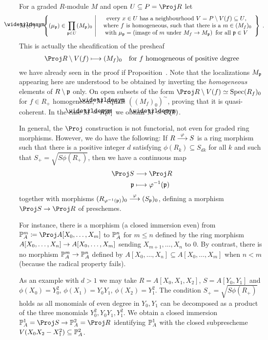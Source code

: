\documentclass[a4paper,parskip=half,numbers=enddot, DIV=12]{scrreprt}
\begin{document}
\begin{rem}
	For a graded $R$-module $M$ and open $U\subseteq P=\Proj R$ let 
	\begin{align*}
		\snake{M}(U)=\left\{(\mu_\pp)\in\prod_{\pp\in U}(M_\pp)_0\st\begin{array}{c}
		\text{every }x\in U\text{ has a neighbourhood }V=P\setminus V(f)\subseteq U\text{,}\\
		\text{ where }f\text{ is homogeneous,  such that there is a }m\in (M_f)_0\\
		\text{with }\mu_\pp=\left(\text{image of }m\text{ under }M_f\morphism M_\pp\right)\text{ for all }\pp\in V
		\end{array}\right\}\;.
	\end{align*}
	 This is actually the sheafification of the presheaf 
	 \begin{align*}
		 \Proj R\setminus V(f)\longmapsto (M_f)_0\quad\text{for }f\text{ homogeneous of positive degree}
	 \end{align*}
	 we have already seen in the proof if Proposition~. Note that the localizations $M_{\mathfrak{p}}$ appearing here are understood to be obtained by inverting the \emph{homogeneous} elements of $R\setminus \mathfrak{p}$ only. On open subsets of the form $\Proj R\setminus V(f)\simeq \Spec (R_f)_0$ for $f\in R_+$ homogeneous, $\snake{M}$ equals $((M_f)_0)^\sim$, proving that it is quasi-coherent. In the case $\snake{M}=R[k]$ we obtain $\snake{M}\simeq \Oo(k)$.
\end{rem}
\begin{rem}
	In general, the $\Proj$ construction is not functorial, not even for graded ring morphisms. However, we do have the following: If $R\morphism[\phi]S$ is a ring morphism such that there is a positive integer $d$ satisfying $\phi(R_k)\subseteq S_{dk}$ for all $k$ and such that $S_+=\sqrt{S\phi(R_+)}$, then we have a continuous map
	\begin{align*}
		\Proj S&\morphism\Proj R\\
		\pp &\longmapsto\phi^{-1}(\pp)
	\end{align*}
	together with morphisms $(R_{\phi^{-1}(\pp)})_0\morphism[\phi](S_\pp)_0$, defining a morphism $\Proj S\morphism \Proj R$ of preschemes. 
	
	For instance, there is a morphism (a closed immersion even) from $\IP_A^m\coloneqq\Proj A[X_0,\ldots,X_m]$ to $\mathbb{P}_A^n$ for $m\leq n$ defined by the ring morphism $A[X_0,\ldots,X_n]\morphism A[X_0,\ldots,X_m]$ sending $X_{m+1},\ldots,X_n$ to $0$. By contrast, there is no morphism $\IP_A^m\morphism\IP_A^n$ defined by $A[X_0,\ldots,X_n]\subseteq A[X_0,\ldots,X_m]$ when $n<m$ (because the radical property fails).
	
	As an example with $d>1$ we may take $R=A[X_0,X_1,X_2]$, $S=A[Y_0,Y_1]$ and $\phi(X_0)=Y_0^2$, $\phi(X_1)=Y_0Y_1$, $\phi(X_2)=Y_1^2$. The condition $S_+=\sqrt{S\phi(R_+)}$ holds as all monomials of even degree in $Y_0,Y_1$ can be decomposed as a product of the three monomials $Y_0^2,Y_0Y_1,Y_1^2$. We obtain a closed immersion $\IP_A^1=\Proj S\morphism \IP_A^2=\Proj R$ identifying $\mathbb{P}_A^1$ with the closed subprescheme $V(X_0X_2-X_1^2)\subseteq \mathbb{P}_A^2$.
\end{rem}
\end{document}
